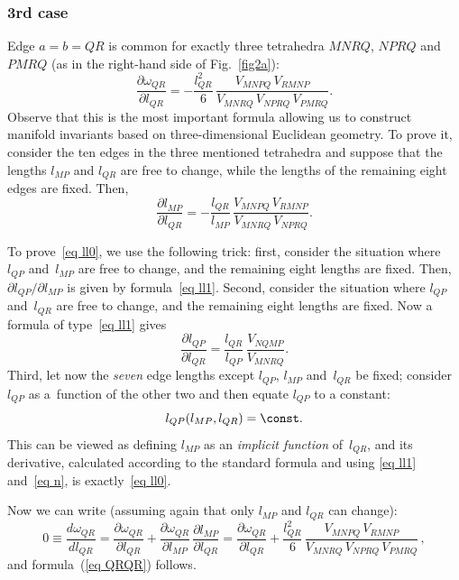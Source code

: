 \subsubsection*{3rd case}
Edge $a=b=QR$ is common for exactly three tetrahedra $MNRQ$, $NPRQ$ and~$PMRQ$ (as in the right-hand side of Fig.~\ref{fig2a}):
\begin{equation}
\frac{\partial \omega_{QR}}{\partial l_{QR}} = -\frac {l_{QR}^2}{6}\, \frac {V_{MNPQ}\,V_{RMNP}}{V_{MNRQ}\,V_{NPRQ}\,V_{PMRQ}}.
\label{eq QRQR}
\end{equation}
Observe that this is the most important formula allowing us to construct manifold invariants based on three-dimensional Euclidean geometry. To prove it, consider the ten edges in the three mentioned tetrahedra and suppose that the lengths $l_{MP}$ and $l_{QR}$ are free to change, while the lengths of the remaining eight edges are f\/ixed. Then,
\begin{equation}
\frac{\partial l_{MP}}{\partial l_{QR}} = -\frac{l_{QR}}{l_{MP}}\, \frac{V_{MNPQ}\,V_{RMNP}}{V_{MNRQ}\, V_{NPRQ}}.
\label{eq ll0}
\end{equation}

To prove~\eqref{eq ll0}, we use the following trick: f\/irst, consider the situation where $l_{QP}$ and~$l_{MP}$ are free to change, and the remaining eight lengths are f\/ixed. Then, $\partial l_{QP} / \partial l_{MP}$ is given by formula~\eqref{eq ll1}. Second, consider the situation where $l_{QP}$ and~$l_{QR}$ are free to change, and the remaining eight lengths are f\/ixed. Now a formula of type~\eqref{eq ll1} gives
\begin{equation}
\frac{\partial l_{QP}}{\partial l_{QR}} = \frac{l_{QR}}{l_{QP}}\, \frac{V_{NQMP}}{V_{MNRQ}}.
\label{eq n}
\end{equation}
Third, let now the \emph{seven} edge lengths except $l_{QP}$, $l_{MP}$ and~$l_{QR}$ be f\/ixed; consider $l_{QP}$ as a~function of the other two and then equate $l_{QP}$ to a constant:
\begin{equation*}
l_{QP}(l_{MP},l_{QR}) = \const .
\end{equation*}
This can be viewed as def\/ining $l_{MP}$ as an \emph{implicit function} of~$l_{QR}$, and its derivative, calculated according to the standard formula and using \eqref{eq ll1} and~\eqref{eq n}, is exactly~\eqref{eq ll0}.

Now we can write (assuming again that only $l_{MP}$ and $l_{QR}$ can change):
\begin{equation*}
0 \equiv \frac{d\omega_{QR}}{dl_{QR}} = \frac{\partial \omega_{QR}}{\partial l_{QR}} + \frac{\partial \omega_{QR}}{\partial l_{MP}}\, \frac{\partial l_{MP}}{\partial l_{QR}} = \frac{\partial \omega_{QR}}{\partial l_{QR}} + \frac {l_{QR}^2}{6}\, \frac{V_{MNPQ}\, V_{RMNP}}{V_{MNRQ}\, V_{NPRQ}\, V_{PMRQ}} \, ,
\end{equation*}
and formula~(\ref{eq QRQR}) follows.

